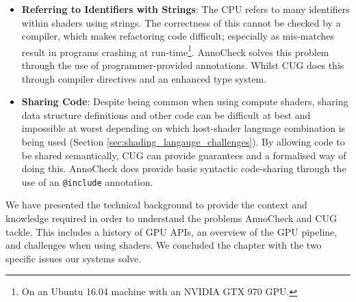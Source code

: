 \documentclass[a4paper,12pt,twoside,openright]{report}
\begin{document}
\begin{itemize}

    \item \textbf{Referring to Identifiers with Strings}: The CPU refers to
    many identifiers within shaders using strings. The correctness of this
    cannot be checked by a compiler, which makes refactoring code difficult;
    especially as mis-matches result in programs crashing at
    run-time\footnote{On an Ubuntu 16.04 machine with an NVIDIA GTX 970 GPU.}.
    AnnoCheck solves this problem through the use of programmer-provided
    annotations. Whilst CUG does this through compiler directives and an
    enhanced type system.

    \item \textbf{Sharing Code}: Despite being common when using compute
    shaders, sharing data structure definitions and other code can be difficult
    at best and impossible at worst depending on which host-shader language
    combination is being used (Section \ref{sec:shading_langauge_challenges}).
    By allowing code to be shared semantically, CUG can provide guarantees and
    a formalised way of doing this. AnnoCheck does provide basic syntactic
    code-sharing through the use of an \texttt{@include} annotation.

\end{itemize}



We have presented the technical background to provide the context and knowledge
required in order to understand the problems AnnoCheck and CUG tackle. This
includes a history of GPU APIs, an overview of the GPU pipeline, and challenges
when using shaders. We concluded the chapter with the two specific issues our
systems solve.



\end{document}
